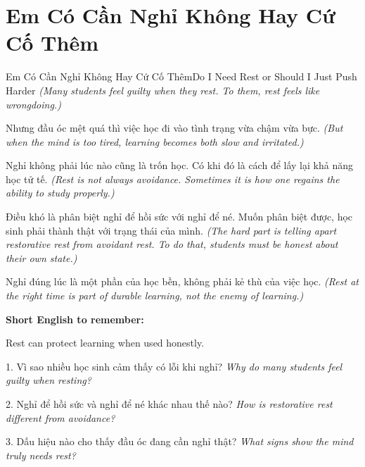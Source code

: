 \section{Em Có Cần Nghỉ Không Hay Cứ Cố Thêm}
\begin{truyen}{Em Có Cần Nghỉ Không Hay Cứ Cố Thêm}{Do I Need Rest or Should I Just Push Harder}
\textit{(Many students feel guilty when they rest. To them, rest feels like wrongdoing.)}

Nhưng đầu óc mệt quá thì việc học đi vào tình trạng vừa chậm vừa bực.
\textit{(But when the mind is too tired, learning becomes both slow and irritated.)}

Nghỉ không phải lúc nào cũng là trốn học. Có khi đó là cách để lấy lại khả năng học tử tế.
\textit{(Rest is not always avoidance. Sometimes it is how one regains the ability to study properly.)}

Điều khó là phân biệt nghỉ để hồi sức với nghỉ để né. Muốn phân biệt được, học sinh phải thành thật với trạng thái của mình.
\textit{(The hard part is telling apart restorative rest from avoidant rest. To do that, students must be honest about their own state.)}
\end{truyen}

\begin{baihoc}
Nghỉ đúng lúc là một phần của học bền, không phải kẻ thù của việc học.
\textit{(Rest at the right time is part of durable learning, not the enemy of learning.)}
\end{baihoc}

\begin{ghinhoanh}
\textbf{Short English to remember:}

Rest can protect learning when used honestly.

\end{ghinhoanh}

\begin{tuhocnhanh}
1. Vì sao nhiều học sinh cảm thấy có lỗi khi nghỉ? \textit{Why do many students feel guilty when resting?}

2. Nghỉ để hồi sức và nghỉ để né khác nhau thế nào? \textit{How is restorative rest different from avoidance?}

3. Dấu hiệu nào cho thấy đầu óc đang cần nghỉ thật? \textit{What signs show the mind truly needs rest?}
\end{tuhocnhanh}
\ngancach

